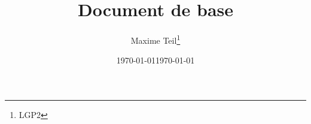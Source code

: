 \documentclass[a4paper, 11pt]{article} %
\date{\today}
\title{Document de base}
\author{Maxime Teil\thanks{LGP2}}
\date{\today}
\begin{document}
	
	\maketitle %
	
	\blinddocument
	
%	
%	
%	
	
\end{document}
